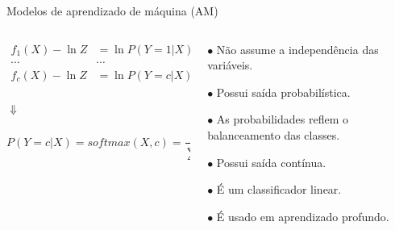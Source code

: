 \begin{frame}{Modelos de aprendizado de máquina (AM)}

\begin{columns}
	\begin{column}{0.55\textwidth}
		\begin{tcolorbox}[colback=blue!5!white,colframe=blue!75!black,valign=center,title=Regressão logística softmax]\selectFont
			\centering
			\begin{equation} 
			\begin{matrix}
			f_1(X) - \ln Z  & = \ln P(Y=1|X) \\
			\cdots & \cdots \\
			f_c(X) - \ln Z & = \ln P(Y=c|X) \\
			\end{matrix}
			\label{eq:logisticaArray}
			\end{equation}
			
			$\Downarrow$
			
			\begin{equation}
			P(Y=c|X) =softmax(X,c) = \frac{e^{f_c(X)}}{\sum_{k=1}^{K} e^{f_k(X)}}
			\label{eq:softmax}
			\end{equation}
		\end{tcolorbox}
	\end{column}
	\begin{column}{0.45\textwidth}
		\begin{tcolorbox}[colback=blue!5!white,colframe=blue!75!black,valign=center,title=Propriedades]\selectFont
			$\bullet$ Não assume a independência das variáveis.
			
			$\bullet$ Possui saída probabilística.
			
			$\bullet$ As probabilidades reflem o balanceamento das classes.
			
			$\bullet$ Possui saída contínua.
			
			$\bullet$ É um classificador linear.
			
			$\bullet$ É usado em aprendizado profundo.
		\end{tcolorbox}
	\end{column}
\end{columns}
\end{frame}

